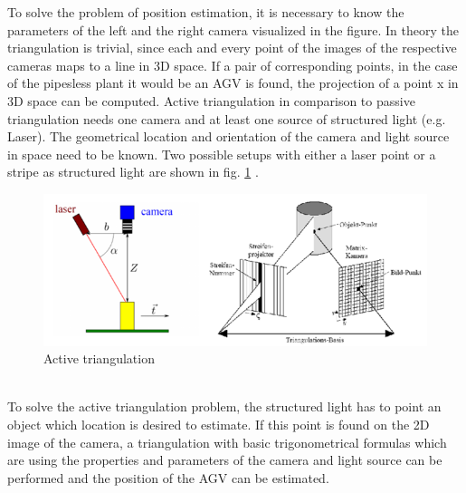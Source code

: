 To solve the problem of position estimation, it is necessary to know the parameters of the left and the right camera visualized in the figure. In theory the triangulation is trivial, since each and every point of the images of the respective cameras maps to a line in 3D space. If a pair of corresponding points, in the case of the pipesless plant it would be an AGV is found, the projection of a point x in 3D space can be computed. 
Active triangulation in comparison to passive triangulation needs one camera and at least one source of structured light (e.g. Laser). The geometrical location and orientation of the camera and light source in space need to be known. Two possible setups with either a laser point or a stripe as structured light are shown in fig. \ref{ative_Triangulation} \cite{MultiObjectTriangulation.}\cite{laser_triangulation}.
\begin{figure}[!htbp]
\centering
\includegraphics[width = 16cm]{Pictures/acticetriangulation}
\caption{Active triangulation}
\label{ative_Triangulation}
\end{figure}\\
To solve the active triangulation problem, the structured light has to point an object which location is desired to estimate. If this point is found on the 2D image of the camera, a triangulation with basic trigonometrical formulas which are using the properties and parameters of the camera and light source can be performed and the position of the AGV can be estimated. 
\pagebreak

